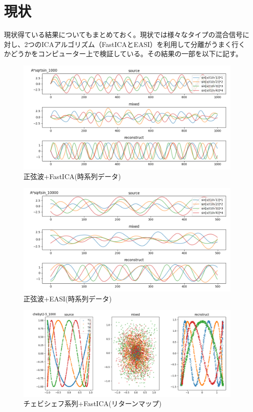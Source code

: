 \documentclass{jsarticle}
\begin{document}
\section{現状}
\label{sec:now}
現状得ている結果についてもまとめておく。現状では様々なタイプの混合信号に対し、2つのICAアルゴリズム（FastICA\cite{fastica}とEASI\cite{easi}）を利用して分離がうまく行くかどうかをコンピューター上で検証している。その結果の一部を以下に記す。

\begin{figure}[H]
    \begin{center}
        \includegraphics[width=13cm]{img/sqrtsin-fastica.png}
        \caption{正弦波+FastICA(時系列データ)}
        \label{img:sqrtsin-fastica}
    \end{center}
\end{figure}
\begin{figure}[H]
    \begin{center}
        \includegraphics[width=13cm]{img/sqrtsin-easi.png}
        \caption{正弦波+EASI(時系列データ)}
        \label{img:sqrtsin-easi}
    \end{center}
\end{figure}
\begin{figure}[H]
    \begin{center}
        \includegraphics[width=13cm]{img/cyebit-fastica.png}
        \caption{チェビシェフ系列+FastICA(リターンマップ)}
        \label{img:cyebit-fastica}
    \end{center}
\end{figure}
\end{document}
